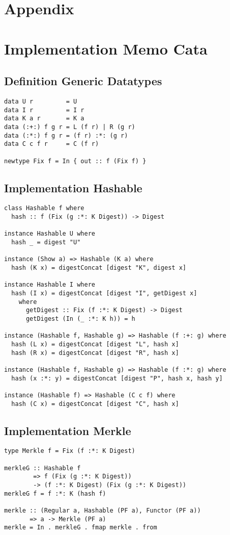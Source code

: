\section{Appendix}
\appendix

\section{Implementation Memo Cata}

\subsection{Definition Generic Datatypes}
\label{app-def-generic-datatypes}
\begin{verbatim}
data U r         = U
data I r         = I r                  
data K a r       = K a                  
data (:+:) f g r = L (f r) | R (g r)
data (:*:) f g r = (f r) :*: (g r) 
data C c f r     = C (f r)

newtype Fix f = In { out :: f (Fix f) }
\end{verbatim}

\subsection{Implementation Hashable}
\label{app-impl-hashable}
\begin{verbatim}
class Hashable f where
  hash :: f (Fix (g :*: K Digest)) -> Digest

instance Hashable U where
  hash _ = digest "U"

instance (Show a) => Hashable (K a) where
  hash (K x) = digestConcat [digest "K", digest x]

instance Hashable I where
  hash (I x) = digestConcat [digest "I", getDigest x]
    where
      getDigest :: Fix (f :*: K Digest) -> Digest
      getDigest (In (_ :*: K h)) = h

instance (Hashable f, Hashable g) => Hashable (f :+: g) where
  hash (L x) = digestConcat [digest "L", hash x]
  hash (R x) = digestConcat [digest "R", hash x]

instance (Hashable f, Hashable g) => Hashable (f :*: g) where
  hash (x :*: y) = digestConcat [digest "P", hash x, hash y]

instance (Hashable f) => Hashable (C c f) where
  hash (C x) = digestConcat [digest "C", hash x]
\end{verbatim}

\subsection{Implementation Merkle}
\label{app-impl-merkle}
\begin{verbatim}
type Merkle f = Fix (f :*: K Digest)

merkleG :: Hashable f 
        => f (Fix (g :*: K Digest)) 
        -> (f :*: K Digest) (Fix (g :*: K Digest))
merkleG f = f :*: K (hash f)

merkle :: (Regular a, Hashable (PF a), Functor (PF a)) 
       => a -> Merkle (PF a)
merkle = In . merkleG . fmap merkle . from
\end{verbatim}

